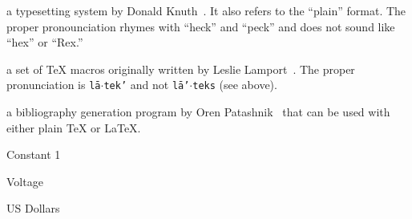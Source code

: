 \begin{nomenclature}
\begin{description}
\item{\makebox[0.75in][l]{\TeX}}
       \parbox[t]{5in}{a typesetting system by Donald Knuth~\cite{knuth}.  It
       also refers to the ``plain'' format.  The proper pronounciation
       rhymes with ``heck'' and ``peck'' and does not sound like
       ``hex'' or ``Rex.''\\}

\item{\makebox[0.75in][l]{\LaTeX}}  
        \parbox[t]{5in}{a set of \TeX{} macros originally written by Leslie 
        Lamport~\cite{lamport}.  The proper pronunciation is 
        {\tt l\={a}$\cdot$tek'} and not {\tt l\={a}'$\cdot$teks} (see above).\\}

\item{} 
         \parbox[t]{5in}{a bibliography generation program by Oren 
                Patashnik~\cite{lamport}
                that can be used with either plain \TeX{} or \LaTeX{}.\\}

\item{} Constant 1

\item{}    Voltage 

\item{\makebox[0.75in][l]{\$}}     US Dollars
\end{description}
\end{nomenclature}


\begin{umiabstract}
  
\end{umiabstract}

\begin{abstract}
  
\end{abstract}


\clearpage{} %
